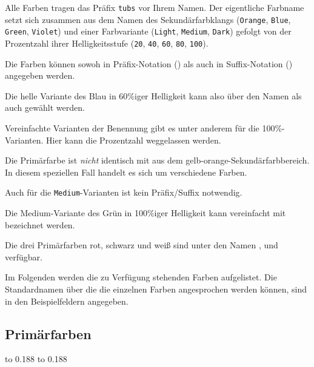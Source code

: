 Alle Farben tragen das Präfix \texttt{tubs} vor Ihrem Namen.
Der eigentliche Farbname setzt sich zusammen aus dem Namen
des Sekundärfarbklangs
(\texttt{Orange}, \texttt{Blue}, \texttt{Green}, \texttt{Violet}) 
und einer Farbvariante
(\texttt{Light}, \texttt{Medium}, \texttt{Dark})
gefolgt von der Prozentzahl ihrer Helligkeitsstufe
(\texttt{20}, \texttt{40}, \texttt{60}, \texttt{80}, \texttt{100}).

Die Farben können sowoh in Präfix-Notation
()
als auch in Suffix-Notation ()
angegeben werden.

\begin{example}
  Die helle Variante des Blau in 60\%iger Helligkeit kann also
  über den Namen  als auch
   gewählt werden.
\end{example}

Vereinfachte Varianten der Benennung gibt es unter anderem für die 100\%-Varianten.
Hier kann die Prozentzahl weggelassen werden.
\begin{important}
Die Primärfarbe  ist \emph{nicht} identisch mit 
aus dem gelb-orange-Sekundärfarbbereich.
In diesem speziellen Fall handelt es sich um verschiedene Farben.
\end{important}
Auch für die \texttt{Medium}-Varianten ist kein Präfix/Suffix notwendig.
\begin{example}
  Die Medium-Variante des Grün in 100\%iger Helligkeit kann vereinfacht
  mit  bezeichnet werden.
\end{example}

Die drei Primärfarben rot, schwarz und weiß sind unter den Namen
,  und  verfügbar.

Im Folgenden werden die zu Verfügung stehenden Farben aufgelistet.
Die Standardnamen über die die einzelnen Farben angesprochen werden können,
sind in den Beispielfeldern angegeben.

\subsection{Primärfarben}

{\sffamily\footnotesize%
\colorbox{tubsRed}{\hbox to 0.188}%
\colorbox{tubsBlack}{\hbox to 0.188}%
\\%
}

